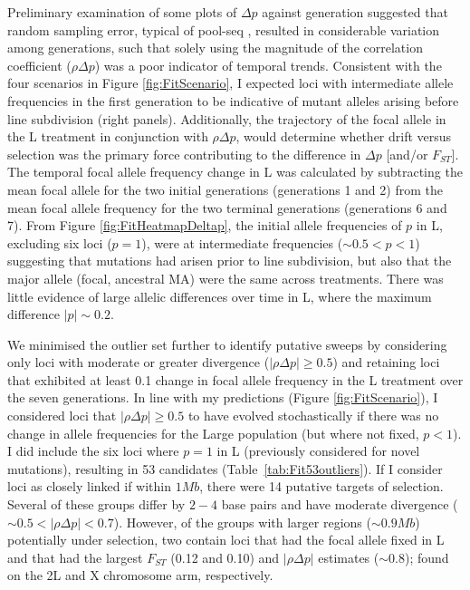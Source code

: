 Preliminary examination of some plots of $\Delta p$ against generation suggested that random sampling error, typical of pool-seq \citep{Gaut13}, resulted in considerable variation among generations, such that solely using the magnitude of the correlation coefficient ($\rho\Delta p$) was a poor indicator of temporal trends. Consistent with the four scenarios in Figure \ref{fig:FitScenario}, I expected loci with intermediate allele frequencies in the first generation to be indicative of mutant alleles arising before line subdivision (right panels). Additionally, the trajectory of the focal allele in the L treatment in conjunction with $\rho\Delta p$, would determine whether drift versus selection was the primary force contributing to the difference in $\Delta p$ [and/or $F_{ST}$]. The temporal focal allele frequency change in L was calculated by subtracting the mean focal allele for the two initial generations (generations 1 and 2) from the mean focal allele frequency for the two terminal generations (generations 6 and 7). From Figure \ref{fig:FitHeatmapDeltap}, the initial allele frequencies of $p$ in L, excluding six loci ($p = 1$), were at intermediate frequencies ($\sim 0.5 < p < 1$) suggesting that mutations had arisen prior to line subdivision, but also that the major allele (focal, ancestral MA) were the same across treatments. There was little evidence of large allelic differences over time in L, where the maximum difference $|p| \sim 0.2$.\par 

We minimised the outlier set further to identify putative sweeps by considering only loci with moderate or greater divergence ($|\rho\Delta p| \geq 0.5$) and retaining loci that exhibited at least 0.1 change in focal allele frequency in the L treatment over the seven generations. In line with my predictions (Figure \ref{fig:FitScenario}), I considered loci that $|\rho\Delta p| \geq 0.5$ to have evolved stochastically if there was no change in allele frequencies for the Large population (but where not fixed, $p<1$). I did include the six loci where $p = 1$ in L (previously considered for novel mutations), resulting in 53 candidates (Table~\ref{tab:Fit53outliers}). If I consider loci as closely linked if within $1Mb$, there were 14 putative targets of selection. Several of these groups differ by $2-4$ base pairs and have moderate divergence ($\sim 0.5 < |\rho\Delta p| < 0.7$). However, of the groups with larger regions ($\sim0.9Mb$) potentially under selection, two contain loci that had the focal allele fixed in L and that had the largest $F_{ST}$ (0.12 and 0.10) and $|\rho\Delta p|$ estimates ($\sim0.8$); found on the 2L and X chromosome arm, respectively. \par

